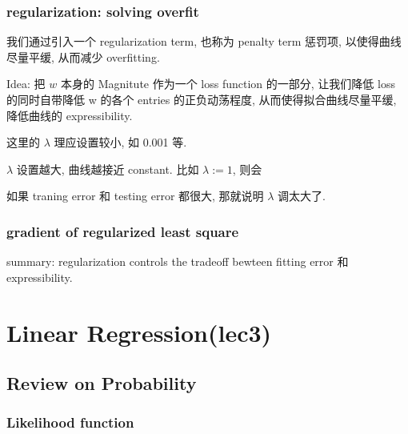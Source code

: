 \documentclass[lang=cn,11pt]{elegantbook}
\begin{document}
\hypertarget{regularization-solving-overfit}{%
\subsection{regularization: solving
overfit}\label{regularization-solving-overfit}}

我们通过引入一个 regularization term, 也称为 penalty term 惩罚项,
以使得曲线尽量平缓, 从而减少 overfitting.

Idea: 把 \(w\) 本身的 Magnitute 作为一个 loss function 的一部分,
让我们降低 loss 的同时自带降低 w 的各个 entries 的正负动荡程度,
从而使得拟合曲线尽量平缓, 降低曲线的 expressibility.


这里的 \(\lambda\) 理应设置较小, 如 0.001 等.

\(\lambda\) 设置越大, 曲线越接近 constant. 比如 \(\lambda := 1\), 则会


如果 traning error 和 testing error 都很大, 那就说明 \(\lambda\)
调太大了.

\hypertarget{gradient-of-regularized-least-square}{%
\subsection{gradient of regularized least
square}\label{gradient-of-regularized-least-square}}


summary: regularization controls the tradeoff bewteen fitting error 和
expressibility.

\hypertarget{linear-regressionlec3}{%
\chapter{Linear Regression(lec3)}\label{linear-regressionlec3}}

\hypertarget{review-on-probability}{%
\section{Review on Probability}\label{review-on-probability}}


\hypertarget{likelihood-function}{%
\subsection{Likelihood function}\label{likelihood-function}}
\end{document}
